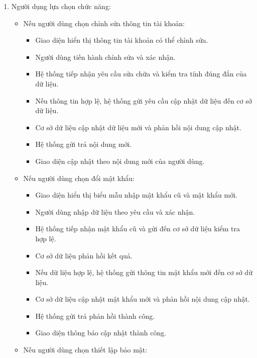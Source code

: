 \documentclass[a4paper]{article}
\begin{document}
\begin{itemize}
\begin{enumerate}
		      \item Người dụng lựa chọn chức năng:
		            \begin{itemize}
			            \item Nếu người dùng chọn chỉnh sửa thông tin tài khoản:
			                  \begin{itemize}
				                  \item Giao diện hiển thị thông tin tài khoản có thể chỉnh sửa.
				                  \item Người dùng tiến hành chỉnh sửa và xác nhận.
				                  \item Hệ thống tiếp nhận yêu cầu sửa chữa và kiểm tra tính đúng đắn của dữ liệu.
				                  \item Nếu thông tin hợp lệ, hệ thống gửi yêu cầu cập nhật dữ liệu đến cơ sở dữ liệu.
				                  \item Cơ sở dữ liệu cập nhật dữ liệu mới và phản hồi nội dung cập nhật.
				                  \item Hệ thống gửi trả nội dung mới.
				                  \item Giao diện cập nhật theo nội dung mới của người dùng.
			                  \end{itemize}
			            \item Nếu người dùng chọn đổi mật khẩu:
			                  \begin{itemize}
				                  \item Giao diện hiển thị biểu mẫu nhập mật khẩu cũ và mật khẩu mới.
				                  \item Người dùng nhập dữ liệu theo yêu cầu và xác nhận.
				                  \item Hệ thống tiếp nhận mật khẩu cũ và gửi đến cơ sở dữ liệu kiểm tra hợp lệ.
				                  \item Cơ sở dữ liệu phản hồi kết quả.
				                  \item Nếu dữ liệu hợp lệ, hệ thống gửi thông tin mật khẩu mới đến cơ sở dữ liệu.
				                  \item Cơ sở dữ liệu cập nhật mật khẩu mới và phản hồi nội dung cập nhật.
				                  \item Hệ thống gửi trả phản hồi thành công.
				                  \item Giao diện thông báo cập nhật thành công.
			                  \end{itemize}
			            \item Nếu người dùng chọn thiết lập bảo mật:

\end{itemize}
\end{enumerate}
\end{itemize}
\end{document}
